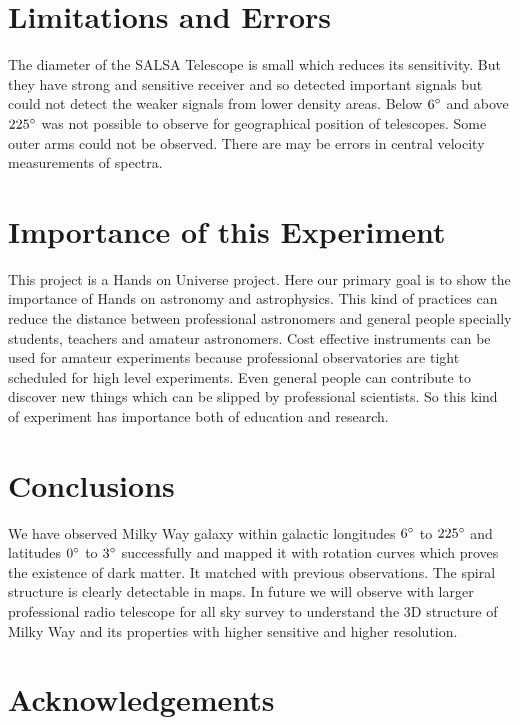 \documentclass[fleqn,usenatbib]{mnras}
\begin{document}
\section{Limitations and Errors}

The diameter of the SALSA Telescope is small which reduces its sensitivity. But they have strong and sensitive receiver and so detected important signals but could not detect the weaker  signals from lower density areas. Below $6\hbox{$^\circ$}$ and above $225\hbox{$^\circ$}$ was not possible to observe for geographical position of telescopes. Some outer arms could not be observed. There are may be errors in central velocity measurements of spectra.

\section{Importance of this Experiment}

This project is a Hands on Universe project\citep{Ferlet2006}. Here our primary goal is to show the importance of Hands on astronomy and astrophysics. This kind of practices can reduce the distance between professional astronomers and general people specially students, teachers and amateur astronomers. Cost effective instruments can be used for amateur experiments because professional observatories are tight scheduled for high level experiments. Even general people can contribute to discover new things which can be slipped by professional scientists. So this kind of experiment has importance both of education and research.


\section{Conclusions}

We have observed Milky Way galaxy within galactic longitudes $6\hbox{$^\circ$}$ to $225\hbox{$^\circ$}$ and latitudes $0\hbox{$^\circ$}$ to $3\hbox{$^\circ$}$ successfully and mapped it with rotation curves which proves the existence of dark matter. It matched with previous observations. The spiral structure is clearly detectable in maps. In future we will observe with larger professional radio telescope for all sky survey to understand the 3D structure of Milky Way and its properties with higher sensitive and higher resolution.

\section*{Acknowledgements}
\end{document}
